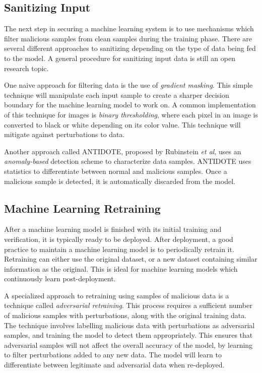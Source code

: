 \documentclass[11pt,conference]{IEEEtran}
\begin{document}
\subsection{Sanitizing Input}
The next step in securing a machine learning system is to use mechanisms which
filter malicious samples from clean samples during the training phase. There
are several different approaches to sanitizing depending on the type of data
being fed to the model. A general procedure for sanitizing input data is still
an open research topic.

One naive approach for filtering data is the use of \emph{gradient masking}.
This simple technique will manipulate each input sample to create a sharper
decision boundary for the machine learning model to work on. A common
implementation of this technique for images is \emph{binary thresholding},
where each pixel in an image is converted to black or white depending on its
color value. This technique will mitigate against perturbations to data.

Another approach called ANTIDOTE, proposed by Rubinstein \emph{et al}, uses an \emph{anomaly-based}
detection scheme to characterize data samples. ANTIDOTE uses statistics to
differentiate between normal and malicious samples. Once a malicious sample is
detected, it is automatically discarded from the model.

\subsection{Machine Learning Retraining}
After a machine learning model is finished with its initial training and
verification, it is typically ready to be deployed. After deployment, a good
practice to maintain a machine learning model is to periodically retrain it.
Retraining can either use the original dataset, or a new dataset containing
similar information as the original. This is ideal for machine learning models
which continuously learn post-deployment.

A specialized approach to retraining using samples of malicious data is a technique called
\emph{adversarial retraining}. This process requires  
a sufficient number of malicious samples with perturbations, along with the
original training data. The technique
involves labelling malicious data with perturbations as adversarial samples, and training
the model to detect them appropriately. This ensures that adversarial samples will not affect
the overall accuracy of the model, by learning to filter perturbations added to
any new data. The model will learn to differentiate between legitimate and
adversarial data when re-deployed.
\end{document}
